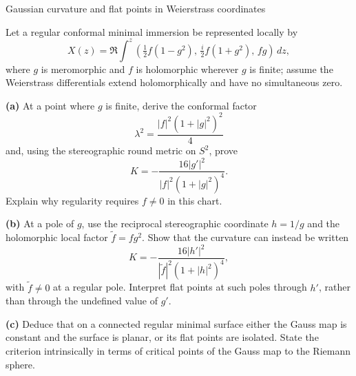 \begin{problem}[CP-IV-0008]
\label{prob:cp-iv-0008}
Gaussian curvature and flat points in Weierstrass coordinates

Let a regular conformal minimal immersion be represented locally by
\[
X(z)=\Re\int^z\left(\tfrac12 f(1-g^2),\,
\tfrac{i}{2}f(1+g^2),\,fg\right)\,dz,
\]
where $g$ is meromorphic and $f$ is holomorphic wherever $g$ is finite;
assume the Weierstrass differentials extend holomorphically and have
no simultaneous zero.

\par\noindent\textbf{(a)} At a point where $g$ is finite, derive the conformal factor
\[
\lambda^2=\frac{|f|^2(1+|g|^2)^2}{4}
\]
and, using the stereographic round metric on $S^2$, prove
\[
K=-\frac{16|g'|^2}{|f|^2(1+|g|^2)^4}.
\]
Explain why regularity requires $f\ne0$ in this chart.

\par\noindent\textbf{(b)} At a pole of $g$, use the reciprocal stereographic
coordinate $h=1/g$ and the holomorphic local factor $\widetilde f=fg^2$.
Show that the curvature can instead be written
\[
K=-\frac{16|h'|^2}{|\widetilde f|^2(1+|h|^2)^4},
\]
with $\widetilde f\ne0$ at a regular pole. Interpret flat points at such
poles through $h'$, rather than through the undefined value of $g'$.

\par\noindent\textbf{(c)} Deduce that on a connected regular minimal surface
either the Gauss map is constant and the surface is planar, or its flat
points are isolated. State the criterion intrinsically in terms of
critical points of the Gauss map to the Riemann sphere.
\end{problem}



